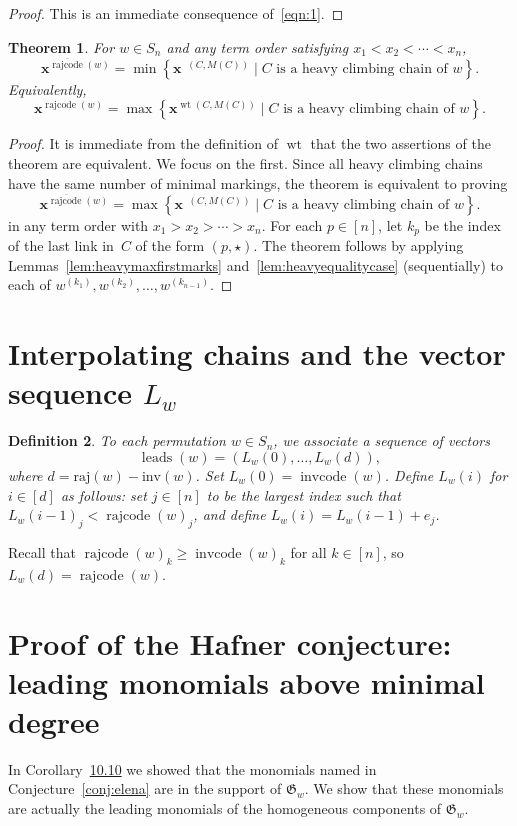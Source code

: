 \documentclass[10pt,a4paper]{amsart}
\newcommand{\absrajcode}[1]{\mathrm{raj}(#1)}
\newcommand{\absinvcode}[1]{\mathrm{inv}(#1)}
\DeclareMathOperator{\leads}{\mathrm{leads}}
\DeclareMathOperator{\wt}{\mathrm{wt}}
\DeclareMathOperator{\dwt}{\overline{\mathrm{wt}}}
\DeclareMathOperator{\cc}{\mathrm{invcode}}
\DeclareMathOperator{\rr}{\mathrm{rajcode}}
\newcommand{\orr}{\overline{\rr}}
\newtheorem{theorem}{Theorem}[section]
\newtheorem{definition}[theorem]{Definition}
\begin{document}
\begin{proof}
	This is an immediate consequence of~\eqref{eqn:1}.
\end{proof}

\setcounter{section}{9}\setcounter{theorem}{5}
\begin{theorem}
	\label{thm:leadingchainweight}
	For $w\in S_n$ and any term order satisfying $x_1<x_2<\cdots<x_n$,
	\[\bm{x}^{\orr(w)} = \min \left\{\bm{x}^{\dwt(C,M(C))} \mid C \mbox{ is a heavy climbing chain of } w \right\}. \] 
	Equivalently,
	\[\bm{x}^{\rr(w)} = \max \left\{\bm{x}^{\wt(C,M(C))} \mid C \mbox{ is a heavy climbing chain of } w \right\}. \] 
\end{theorem}

\begin{proof}
	It is immediate from the definition of $\wt$ that the two assertions of the theorem are equivalent. We focus on the first. Since all heavy climbing chains have the same number of minimal markings, the theorem is equivalent to proving 
	\[\bm{x}^{\orr(w)} = \max \left\{\bm{x}^{\dwt(C,M(C))} \mid C \mbox{ is a heavy climbing chain of } w \right\}. \] 
	in any term order with $x_1>x_2>\cdots>x_n$. 
	For each $p\in[n]$, let $k_p$ be the index of the last link in~$C$ of the form $(p,\star)$. The theorem follows by applying Lemmas~\ref{lem:heavymaxfirstmarks} and~\ref{lem:heavyequalitycase} (sequentially) to each of $w^{(k_1)},w^{(k_2)},\ldots,w^{(k_{n-1})}$.
\end{proof}

\section{Interpolating chains and the vector sequence $L_w$}
\setcounter{section}{10}\setcounter{theorem}{3}
\begin{definition}
	To each permutation $w\in S_n$, we associate a sequence of vectors \[\leads(w)=(L_w(0),\ldots,L_w(d)),\] where $d=\absrajcode{w}-\absinvcode{w}$. Set $L_w(0)=\cc(w)$. Define $L_w(i)$ for $i\in [d]$ as follows: set $j\in [n]$ to be the largest index such that $L_w(i-1)_j<\rr(w)_j$, and define $L_w(i) = L_w(i-1) + e_j$.
\end{definition}

Recall that $\rr(w)_k\geq \cc(w)_k$ for all $k\in [n]$, so $L_w(d) = \rr(w)$. 

\section{Proof of the Hafner conjecture: leading monomials above minimal degree}
In Corollary~\href{https://alco.centre-mersenne.org/articles/10.5802/alco.358/}{10.10} we showed that the monomials named in Conjecture~\ref{conj:elena} are in the support of $\mathfrak{G}_w$. We show that these monomials are actually the leading monomials of the homogeneous components of $\mathfrak{G}_w$.
\end{document}
